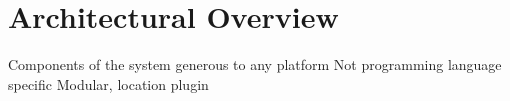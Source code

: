 \section{Architectural Overview}
Components of the system
generous to any platform
Not programming language specific
Modular, location plugin 